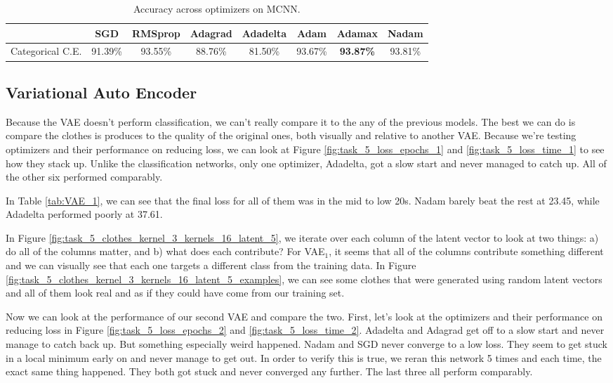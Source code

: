 \documentclass[12pt]{article}
\begin{document}
\begin{table}[]
  \centering
  \caption{Accuracy across optimizers on MCNN.}
  \label{tab:MCNN}
  \begin{tabular}{|c|c|c|c|c|c|c|c|}
  \hline
   & SGD & RMSprop & Adagrad & Adadelta & Adam & Adamax & Nadam \\ \hline
   Categorical C.E. & 91.39\% & 93.55\% & 88.76\% & 81.50\% & 93.67\% & \textbf{93.87\%} & 93.81\% \\ \hline
  \end{tabular}
  \end{table}


\subsection{Variational Auto Encoder}

Because the VAE doesn't perform classification, we can't really compare it to the any of the previous models.
The best we can do is compare the clothes is produces to the quality of the original ones, both visually and relative to another VAE.
Because we're testing optimizers and their performance on reducing loss, we can look at
 Figure \ref{fig:task_5_loss_epochs_1} and \ref{fig:task_5_loss_time_1} to see how they stack up.
Unlike the classification networks, only one optimizer, Adadelta, got a slow start and never managed to catch up.
All of the other six performed comparably.

In Table \ref{tab:VAE_1}, we can see that the final loss for all of them was in the mid to low 20s.
Nadam barely beat the rest at 23.45, while Adadelta performed poorly at 37.61.

In Figure \ref{fig:task_5_clothes_kernel_3_kernels_16_latent_5}, we iterate over each column of the latent vector to
 look at two things: a) do all of the columns matter, and b) what does each contribute?
For VAE$_1$, it seems that all of the columns contribute something different and we can visually see that each one targets a different class
 from the training data.
In Figure \ref{fig:task_5_clothes_kernel_3_kernels_16_latent_5_examples}, we can see some clothes that were
 generated using random latent vectors and all of them look real and as if they could have come from our training set.


Now we can look at the performance of our second VAE and compare the two.
First, let's look at the optimizers and their performance on reducing loss in
 Figure \ref{fig:task_5_loss_epochs_2} and \ref{fig:task_5_loss_time_2}.
Adadelta and Adagrad get off to a slow start and never manage to catch back up.
But something especially weird happened.
Nadam and SGD never converge to a low loss.
They seem to get stuck in a local minimum early on and never manage to get out.
In order to verify this is true, we reran this network 5 times and each time, the exact same thing happened.
They both got stuck and never converged any further.
The last three all perform comparably.
\end{document}
